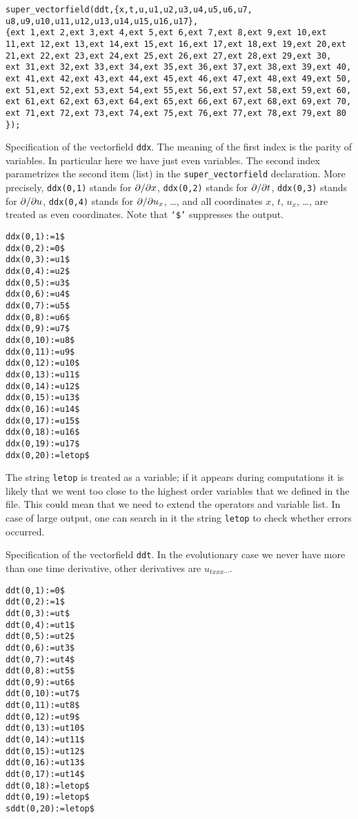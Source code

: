 \begin{verbatim}
super_vectorfield(ddt,{x,t,u,u1,u2,u3,u4,u5,u6,u7,
u8,u9,u10,u11,u12,u13,u14,u15,u16,u17},
{ext 1,ext 2,ext 3,ext 4,ext 5,ext 6,ext 7,ext 8,ext 9,ext 10,ext
11,ext 12,ext 13,ext 14,ext 15,ext 16,ext 17,ext 18,ext 19,ext 20,ext
21,ext 22,ext 23,ext 24,ext 25,ext 26,ext 27,ext 28,ext 29,ext 30,
ext 31,ext 32,ext 33,ext 34,ext 35,ext 36,ext 37,ext 38,ext 39,ext 40,
ext 41,ext 42,ext 43,ext 44,ext 45,ext 46,ext 47,ext 48,ext 49,ext 50,
ext 51,ext 52,ext 53,ext 54,ext 55,ext 56,ext 57,ext 58,ext 59,ext 60,
ext 61,ext 62,ext 63,ext 64,ext 65,ext 66,ext 67,ext 68,ext 69,ext 70,
ext 71,ext 72,ext 73,ext 74,ext 75,ext 76,ext 77,ext 78,ext 79,ext 80
});
\end{verbatim}

Specification of the vectorfield \texttt{ddx}.  The meaning of the first index
is the parity of variables.  In particular here we have just even variables.
The second index parametrizes the second item (list) in the
\texttt{super\_vectorfield} declaration. More precisely, \texttt{ddx(0,1)}
stands for $\pd{}{x}$, \texttt{ddx(0,2)} stands for $\pd{}{t}$,
\texttt{ddx(0,3)} stands for $\pd{}{u}$, \texttt{ddx(0,4)} stands for
$\pd{}{u_x}$, \dots, and all coordinates $x$, $t$, $u_x$, \dots, are treated as
even coordinates.  Note that \texttt{`\$'} suppresses the output.
\begin{verbatim}
ddx(0,1):=1$
ddx(0,2):=0$
ddx(0,3):=u1$
ddx(0,4):=u2$
ddx(0,5):=u3$
ddx(0,6):=u4$
ddx(0,7):=u5$
ddx(0,8):=u6$
ddx(0,9):=u7$
ddx(0,10):=u8$
ddx(0,11):=u9$
ddx(0,12):=u10$
ddx(0,13):=u11$
ddx(0,14):=u12$
ddx(0,15):=u13$
ddx(0,16):=u14$
ddx(0,17):=u15$
ddx(0,18):=u16$
ddx(0,19):=u17$
ddx(0,20):=letop$
\end{verbatim}
The string \texttt{letop} is treated as a variable; if it appears during
computations it is likely that we went too close to the highest order variables
that we defined in the file. This could mean that we need to extend the
operators and variable list. In case of large output, one can search in it the
string \texttt{letop} to check whether errors occurred.

Specification of the vectorfield \texttt{ddt}. In the evolutionary case we
never have more than one time derivative, other derivatives are
$u_{txxx\cdots}$.
\begin{verbatim}
ddt(0,1):=0$
ddt(0,2):=1$
ddt(0,3):=ut$
ddt(0,4):=ut1$
ddt(0,5):=ut2$
ddt(0,6):=ut3$
ddt(0,7):=ut4$
ddt(0,8):=ut5$
ddt(0,9):=ut6$
ddt(0,10):=ut7$
ddt(0,11):=ut8$
ddt(0,12):=ut9$
ddt(0,13):=ut10$
ddt(0,14):=ut11$
ddt(0,15):=ut12$
ddt(0,16):=ut13$
ddt(0,17):=ut14$
ddt(0,18):=letop$
ddt(0,19):=letop$
sddt(0,20):=letop$
\end{verbatim}

